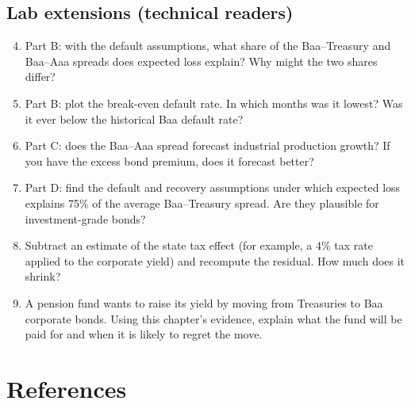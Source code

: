 \subsection*{Lab extensions (technical readers)}

\begin{enumerate}
  \setcounter{enumi}{3}
  \item Part B: with the default assumptions, what share of the Baa--Treasury and Baa--Aaa spreads does expected loss explain? Why might the two shares differ?
  \item Part B: plot the break-even default rate. In which months was it lowest? Was it ever below the historical Baa default rate?
  \item Part C: does the Baa--Aaa spread forecast industrial production growth? If you have the excess bond premium, does it forecast better?
  \item Part D: find the default and recovery assumptions under which expected loss explains 75\% of the average Baa--Treasury spread. Are they plausible for investment-grade bonds?
  \item Subtract an estimate of the state tax effect (for example, a 4\% tax rate applied to the corporate yield) and recompute the residual. How much does it shrink?
  \item A pension fund wants to raise its yield by moving from Treasuries to Baa corporate bonds. Using this chapter's evidence, explain what the fund will be paid for and when it is likely to regret the move.
\end{enumerate}

\section*{References}


